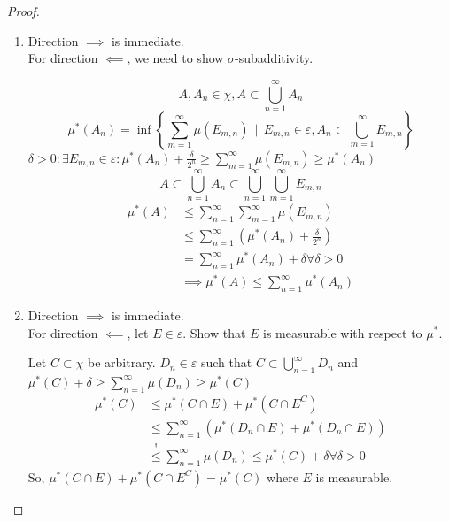 \documentclass[a4paper]{article}
\numberwithin{lecref}{section}
\theoremstyle{break}
\newcommand{\SetDef}[2]{\left\{#1\,\mid\,#2\right\}}
\begin{document}
\begin{proof}
  \begin{enumerate}
    \item Direction $\implies$ is immediate. \\
      For direction $\impliedby$, we need to show $\sigma$-subadditivity.

      \[ A, A_n \in \chi, A \subset \bigcup_{n=1}^\infty A_n \]
      \[ \mu^*(A_n) = \inf\SetDef{\sum_{m=1}^\infty \mu(E_{m,n})}{E_{m,n} \in \varepsilon, A_n \subset \bigcup_{m=1}^\infty E_{m,n}} \]
      $\delta > 0: \exists E_{m,n} \in \varepsilon: \mu^*(A_n) + \frac{\delta}{2^n} \geq \sum_{m=1}^\infty \mu(E_{m,n}) \geq \mu^*(A_n)$
      \[ A \subset \bigcup_{n=1}^\infty A_n \subset \bigcup_{n=1}^\infty \bigcup_{m=1}^\infty E_{m,n} \]
      \begin{align*}
        \mu^*(A) &\leq \sum_{n=1}^\infty \sum_{m=1}^\infty \mu\left(E_{m,n}\right) \\
          &\leq \sum_{n=1}^\infty \left(\mu^*(A_n) + \frac{\delta}{2^n}\right) \\
          &= \sum_{n=1}^\infty \mu^*(A_n) + \delta \forall \delta > 0 \\
          &\implies \mu^*(A) \leq \sum_{n=1}^\infty \mu^*(A_n)
      \end{align*}
    \item Direction $\implies$ is immediate. \\
      For direction $\impliedby$, let $E \in \varepsilon$. Show that $E$ is measurable with respect to $\mu^*$.

      Let $C \subset \chi$ be arbitrary. $D_n \in \varepsilon$ such that $C \subset \bigcup_{n=1}^\infty D_n$ and $\mu^*(C) + \delta \geq \sum_{n=1}^\infty \mu(D_n) \geq \mu^*(C)$
      \begin{align*}
        \mu^*(C) &\leq \mu^*(C \cap E) + \mu^*(C \cap E^C) \\
          &\leq \sum_{n=1}^\infty \left(\mu^*(D_n \cap E) + \mu^*(D_n \cap E)\right) \\
          &\overset!\leq \sum_{n=1}^\infty \mu(D_n) \leq \mu^*(C) + \delta \forall \delta > 0
      \end{align*}
      So, $\mu^*(C \cap E) + \mu^*(C \cap E^C) = \mu^*(C)$ where $E$ is measurable.
  \end{enumerate}
\end{proof}
\end{document}
